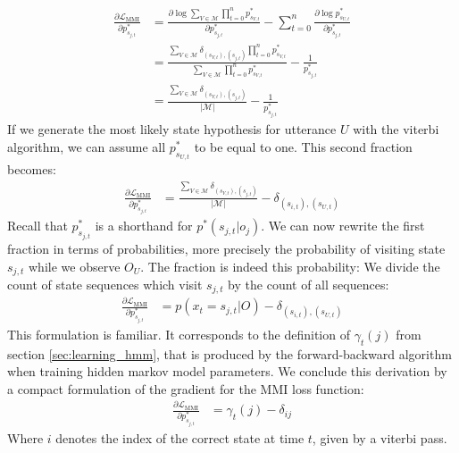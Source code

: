 \begin{align*}
\frac{\partial\mathcal{L}_{\text{MMI}}}{\partial p^*_{s_{j,t}}} &= \frac{\partial \log \sum_{V \in \mathcal{M}} \prod_{t = 0}^{n} p^*_{s_{V,t}}}{\partial p^*_{s_{j,t}}} - \sum_{t = 0}^{n} \frac{\partial \log p^*_{s_{U,t}}}{\partial p^*_{s_{j,t}}} \\
&= \frac{ \sum_{V \in \mathcal{M}} \delta_{(s_{V,t}),(s_{j,t})} \prod_{t = 0}^{n} p^*_{s_{V,t}}}{\sum_{V \in \mathcal{M}} \prod_{t = 0}^{n} p^*_{s_{V,t}}} - \frac{1}{p^*_{s_{j,t}}}\\
&= \frac{ \sum_{V \in \mathcal{M}} \delta_{(s_{V,t}),(s_{j,t})} }{|\mathcal{M}|} - \frac{1}{p^*_{s_{j,t}}}
\end{align*}
If we generate the most likely state hypothesis for utterance $U$ with the viterbi algorithm, we can assume all $p^*_{s_{U,t}}$ to be equal to one. This second fraction becomes:
\begin{align*}
\frac{\partial\mathcal{L}_{\text{MMI}}}{\partial p^*_{s_{j,t}}} &= \frac{ \sum_{V \in \mathcal{M}} \delta_{(s_{V,t}),(s_{j,t})} }{|\mathcal{M}|} - \delta_{(s_{i,t}),(s_{U,t})}
\end{align*}
Recall that $p^*_{s_{j,t}}$ is a shorthand for $p^*(s_{j,t}|o_j)$. We can now rewrite the first fraction in terms of probabilities, more precisely the probability of visiting state $s_{j,t}$ while we observe $O_U$. The fraction is indeed this probability: We divide the count of state sequences which visit $s_{j,t}$ by the count of all sequences:
\begin{align*}
\frac{\partial\mathcal{L}_{\text{MMI}}}{\partial p^*_{s_{j,t}}} &= p(x_t = s_{j,t}|O) - \delta_{(s_{i,t}),(s_{U,t})}
\end{align*}
This formulation is familiar. It corresponds to the definition of $\gamma_t(j)$ from section \ref{sec:learning_hmm}, that is produced by the forward-backward algorithm when training hidden markov model parameters. We conclude this derivation by a compact formulation of the gradient for the MMI loss function:
\begin{align}
\label{eq:mmi_grad}
\frac{\partial\mathcal{L}_{\text{MMI}}}{\partial p^*_{s_{j,t}}} &= \gamma_t(j) - \delta_{ij}
\end{align}
Where $i$ denotes the index of the correct state at time $t$, given by a viterbi pass. 
